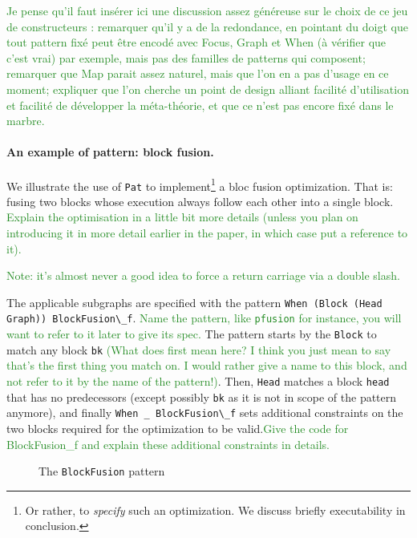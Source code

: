 \documentclass[11pt]{article}
\newcommand{\inlinecoq}[1]{\mbox{\lstinline[style=customcoq,columns=fixed,basewidth=.48em]{#1}}}
\newcommand{\ilc}[1]{\inlinecoq{#1}}
\newcommand{\yz}[1]{\textcolor{ForestGreen}{#1}}
\newcommand{\pat}{\texttt{Pat}\xspace}
\begin{document}
\yz{Je pense qu'il faut insérer ici une discussion assez généreuse sur le choix de ce jeu de constructeurs : remarquer qu'il y a de la redondance, en pointant du doigt que tout pattern fixé peut être encodé avec Focus, Graph et When (à vérifier que c'est vrai) par exemple, mais pas des familles de patterns qui composent; remarquer que Map parait assez naturel, mais que l'on en a pas d'usage en ce moment; expliquer que l'on cherche un point de design alliant facilité d'utilisation et facilité de développer la méta-théorie, et que ce n'est pas encore fixé dans le marbre.}

\paragraph*{An example of pattern: block fusion.}
We illustrate the use of \pat{} to implement\footnote{Or rather, to \emph{specify} such an optimization. We discuss briefly executability in conclusion.} a bloc fusion optimization. 
That is: fusing two blocks whose execution always follow each other into a single block. \yz{Explain the optimisation in a little bit more details (unless you plan on introducing it in more detail earlier in the paper, in which case put a reference to it).}

\yz{Note: it's almost never a good idea to force a return carriage via a double slash.}

The applicable subgraphs are specified with the pattern \ilc{When (Block (Head Graph)) BlockFusion\_f}. \yz{Name the pattern, like \ilc{pfusion} for instance, you will want to refer to it later to give its spec.}
The pattern starts by the \ilc{Block} to match any block \ilc{bk} \yz{(What does first mean here? I think you just mean to say that's the first thing you match on. I would rather give a name to this block, and not refer to it by the name of the pattern!)}. Then, \ilc{Head} matches a block \ilc{head} that has no predecessors (except possibly \ilc{bk} as it is not in scope of the pattern anymore), and finally \ilc{When _ BlockFusion\_f} sets additional constraints on the two blocks required for the optimization to be valid.\yz{Give the code for BlockFusion\_f and explain these additional constraints in details.}

\begin{figure}[h]
  \caption{The \ilc{BlockFusion} pattern}
  \label{fig:fusion}
\end{figure}
\end{document}
